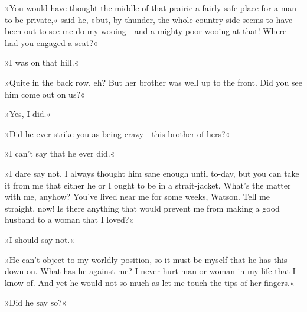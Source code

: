 »You would have thought the middle of that prairie a fairly safe place for a man to be private,« said he, »but, by thunder, the whole country-side seems to have been out to see me do my wooing—and a mighty poor wooing at that! Where had you engaged a seat?«

»I was on that hill.«

»Quite in the back row, eh? But her brother was well up to the front. Did you see him come out on us?«

»Yes, I did.«

»Did he ever strike you as being crazy—this brother of hers?«

»I can't say that he ever did.«

»I dare say not. I always thought him sane enough until to-day, but you can take it from me that either he or I ought to be in a strait-jacket. What's the matter with me, anyhow? You've lived near me for some weeks, Watson. Tell me straight, now! Is there anything that would prevent me from making a good husband to a woman that I loved?«

»I should say not.«

»He can't object to my worldly position, so it must be myself that he has this down on. What has he against me? I never hurt man or woman in my life that I know of. And yet he would not so much as let me touch the tips of her fingers.«

»Did he say so?«


